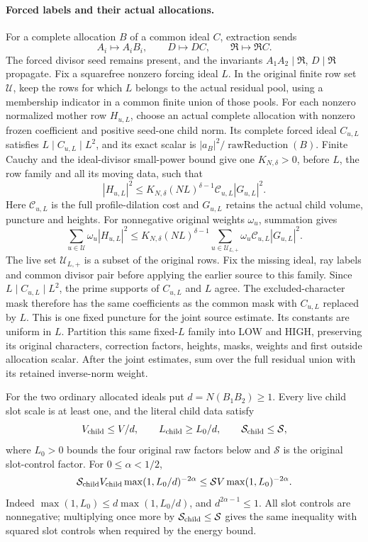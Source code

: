 \paragraph{Forced labels and their actual allocations.}
For a complete allocation \(B\) of a common ideal \(C\), extraction sends
\[
 A_i\longmapsto A_iB_i,\qquad D\longmapsto DC,\qquad
 \mathfrak R\longmapsto\mathfrak RC.
\]
The forced divisor seed remains present, and the invariants
\(A_1A_2\mid\mathfrak R\), \(D\mid\mathfrak R\) propagate.
Fix a squarefree nonzero forcing ideal \(L\). In the original finite
row set \(\mathcal U\), keep the rows for which \(L\) belongs to the
actual residual pool, using a membership indicator in a common finite
union of those pools. For each nonzero normalized mother row
\(H_{u,L}\), choose an actual complete allocation with nonzero frozen
coefficient and positive seed-one child norm. Its complete forced ideal
\(C_{u,L}\) satisfies \(L\mid C_{u,L}\mid L^2\), and its exact scalar is
\(\lvert a_B\rvert^2/\operatorname{rawReduction}(B)\).
Finite Cauchy and the ideal-divisor small-power bound give one
\(K_{N,\delta}>0\), before \(L\), the row family and all its moving
data, such that
\[
 |H_{u,L}|^2\le K_{N,\delta}(NL)^{\delta-1}
             \mathcal C_{u,L}|G_{u,L}|^2.
\]
Here \(\mathcal C_{u,L}\) is the full profile-dilation cost and
\(G_{u,L}\) retains the actual child volume, puncture and heights.
For nonnegative original weights \(\omega_u\), summation gives
\[
 \sum_{u\in\mathcal U}\omega_u|H_{u,L}|^2
 \le K_{N,\delta}(NL)^{\delta-1}
 \sum_{u\in\mathcal U_{L,+}}\omega_u
                   \mathcal C_{u,L}|G_{u,L}|^2.
\]
The live set \(\mathcal U_{L,+}\) is a subset of the original rows.
Fix the missing ideal, ray labels and common divisor pair before
applying the earlier source to this family. Since
\(L\mid C_{u,L}\mid L^2\), the prime supports of \(C_{u,L}\) and
\(L\) agree. The excluded-character mask therefore has the same
coefficients as the common mask with \(C_{u,L}\) replaced by \(L\).
This is one fixed puncture for the joint source estimate. Its constants
are uniform in \(L\). Partition this same fixed-\(L\) family into LOW
and HIGH, preserving its original characters, correction factors,
heights, masks, weights and first outside allocation scalar. After the
joint estimates, sum over the full residual union with its retained
inverse-norm weight.

For the two ordinary allocated ideals put \(d=N(B_1B_2)\ge1\). Every
live child slot scale is at least one, and the literal child data satisfy
\[
 V_{\rm child}\le V/d,\qquad
 L_{\rm child}\ge L_0/d,\qquad
 \mathcal S_{\rm child}\le\mathcal S,
\]
where \(L_0>0\) bounds the four original raw factors below and
\(\mathcal S\) is the original slot-control factor. For
\(0\le\alpha<1/2\),
\[
 \mathcal S_{\rm child}V_{\rm child}
       \max(1,L_0/d)^{-2\alpha}
 \le \mathcal S V\max(1,L_0)^{-2\alpha}.
\]
Indeed \(\max(1,L_0)\le d\max(1,L_0/d)\), and
\(d^{2\alpha-1}\le1\). All slot controls are nonnegative; multiplying
once more by \(\mathcal S_{\rm child}\le\mathcal S\) gives the same
inequality with squared slot controls when required by the energy bound.
